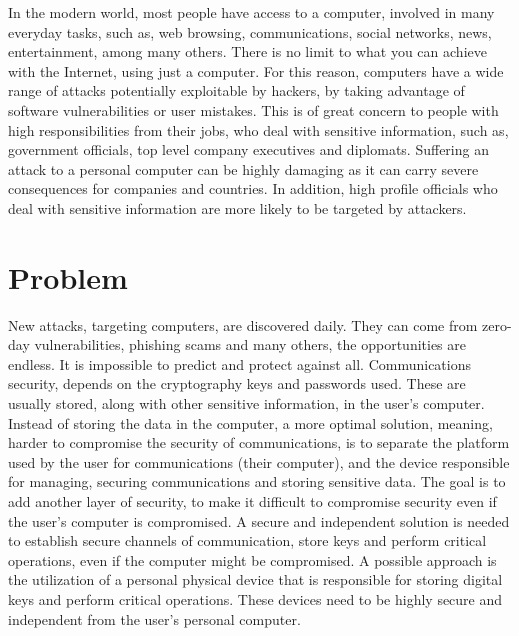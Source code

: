 \cleardoublepage
\label{chap:intro}

In the modern world, most people have access to a computer, involved in many everyday tasks, such as, web browsing, communications, social networks, news, entertainment, among many others.
There is no limit to what you can achieve with the Internet, using just a computer.
For this reason, computers have a wide range of attacks potentially exploitable by hackers, by taking advantage of software vulnerabilities or user mistakes.
This is of great concern to people with high responsibilities from their jobs, who deal with sensitive information, such as, government officials, top level company executives and diplomats.
Suffering an attack to a personal computer can be highly damaging as it can carry severe consequences for companies and countries.
In addition, high profile officials who deal with sensitive information are more likely to be targeted by attackers.

\section{Problem}\label{chap:intro:problem}

New attacks, targeting computers, are discovered daily.
They can come from zero-day vulnerabilities, phishing scams and many others, the opportunities are endless. It is impossible to predict and protect against all.
Communications security, depends on the cryptography keys and passwords used. These are usually stored, along with other sensitive information, in the user's computer.
Instead of storing the data in the computer, a more optimal solution, meaning, harder to compromise the security of communications, is to separate the platform used by the user for communications (their computer), and the device responsible for managing, securing communications and storing sensitive data.
The goal is to add another layer of security, to make it difficult to compromise security even if the user's computer is compromised.
A secure and independent solution is needed to establish secure channels of communication, store keys and perform critical operations, even if the computer might be compromised.
A possible approach is the utilization of a personal physical device that is responsible for storing digital keys and perform critical operations.
These devices need to be highly secure and independent from the user's personal computer.

